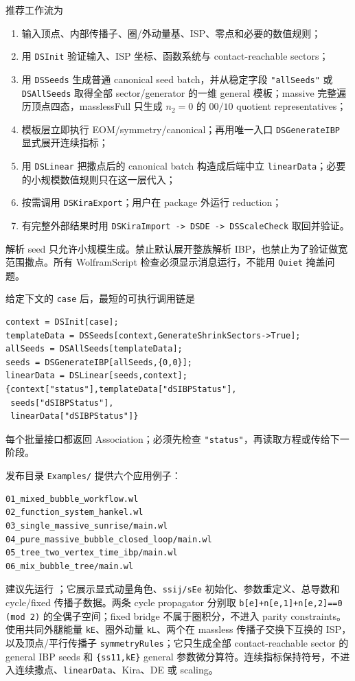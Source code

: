 ﻿\documentclass[a4paper,11pt]{article}
\begin{document}
推荐工作流为
\begin{enumerate}
  \item 输入顶点、内部传播子、圈/外动量基、ISP、零点和必要的数值规则；
  \item 用 \texttt{DSInit} 验证输入、ISP 坐标、函数系统与 contact-reachable sectors；
  \item 用 \texttt{DSSeeds} 生成普通 canonical seed batch，并从稳定字段 \texttt{"allSeeds"} 或 \texttt{DSAllSeeds} 取得全部 sector/generator 的一维 general 模板；massive 完整遍历顶点四态，masslessFull 只生成 $n_2=0$ 的 $00/10$ quotient representatives；
  \item 模板层立即执行 EOM/symmetry/canonical；再用唯一入口 \texttt{DSGenerateIBP} 显式展开连续指标；
  \item 用 \texttt{DSLinear} 把撒点后的 canonical batch 构造成后端中立 \texttt{linearData}；必要的小规模数值规则只在这一层代入；
  \item 按需调用 \texttt{DSKiraExport}；用户在 package 外运行 reduction；
  \item 有完整外部结果时用 \texttt{DSKiraImport -> DSDE -> DSScaleCheck} 取回并验证。
\end{enumerate}

\begin{proofbox}
解析 seed 只允许小规模生成。禁止默认展开整族解析 IBP，也禁止为了验证做宽范围撒点。所有 WolframScript 检查必须显示消息运行，不能用 \texttt{Quiet} 掩盖问题。
\end{proofbox}

给定下文的 \texttt{case} 后，最短的可执行调用链是
\begin{verbatim}
context = DSInit[case];
templateData = DSSeeds[context,GenerateShrinkSectors->True];
allSeeds = DSAllSeeds[templateData];
seeds = DSGenerateIBP[allSeeds,{0,0}];
linearData = DSLinear[seeds,context];
{context["status"],templateData["dSIBPStatus"],
 seeds["dSIBPStatus"],
 linearData["dSIBPStatus"]}
\end{verbatim}
每个批量接口都返回 Association；必须先检查 \texttt{"status"}，再读取方程或传给下一阶段。

发布目录 \texttt{Examples/} 提供六个应用例子：
\begin{verbatim}
01_mixed_bubble_workflow.wl
02_function_system_hankel.wl
03_single_massive_sunrise/main.wl
04_pure_massive_bubble_closed_loop/main.wl
05_tree_two_vertex_time_ibp/main.wl
06_mix_bubble_tree/main.wl
\end{verbatim}
建议先运行 ；它展示显式动量角色、\texttt{ssij/sEe} 初始化、参数重定义、总导数和 cycle/fixed 传播子数据。两条 cycle propagator 分别取
\texttt{b[e]+n[e,1]+n[e,2]==0 (mod 2)} 的全偶子空间；fixed bridge 不属于圈积分，不进入 parity constraints。 使用共同外腿能量 \texttt{kE}、圈外动量 \texttt{kL}、两个在 massless 传播子交换下互换的 ISP，以及顶点/平行传播子 \texttt{symmetryRules}；它只生成全部 contact-reachable sector 的 general IBP seeds 和 \texttt{\{ss11,kE\}} general 参数微分算符。连续指标保持符号，不进入连续撒点、\texttt{linearData}、Kira、DE 或 scaling。
\end{document}
